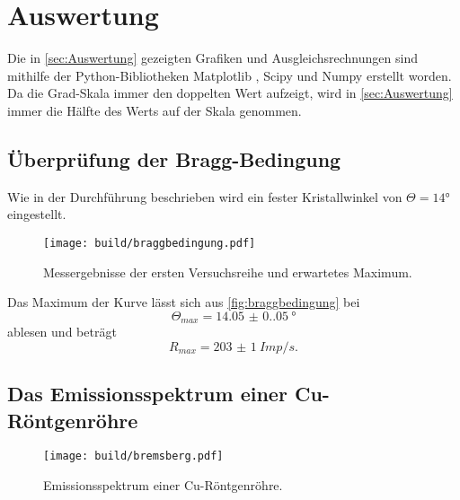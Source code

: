 \newpage
\section{Auswertung}
\label{sec:Auswertung}

Die in \autoref{sec:Auswertung} gezeigten Grafiken und Ausgleichsrechnungen sind mithilfe der Python-Bibliotheken Matplotlib \cite{matplotlib}, Scipy \cite{scipy} und Numpy \cite{numpy}
erstellt worden.
Da die Grad-Skala immer den doppelten Wert aufzeigt, wird in \autoref{sec:Auswertung} immer
die Hälfte des Werts auf der Skala genommen.
\subsection{Überprüfung der Bragg-Bedingung}

Wie in der Durchführung beschrieben wird ein fester Kristallwinkel von $\Theta = 14°$
eingestellt. 
\begin{figure}[H]
  \texttt{[image: build/braggbedingung.pdf]}
  \caption{Messergebnisse der ersten Versuchsreihe und erwartetes Maximum.}
  \label{fig:braggbedingung}
\end{figure}
Das Maximum der Kurve lässt sich aus \autoref{fig:braggbedingung} bei
\begin{equation*}
  \Theta_{max} = \SI{14.05(0.05)}{°}
\end{equation*}
ablesen und beträgt
\begin{equation*}
  R_{max} = \SI{203(1)}{Imp/s}.
\end{equation*}

\subsection{Das Emissionsspektrum einer Cu-Röntgenröhre}
\begin{figure}[H]
  \texttt{[image: build/bremsberg.pdf]}
  \caption{Emissionsspektrum einer Cu-Röntgenröhre.}
  \label{fig:spektrum}
\end{figure}

